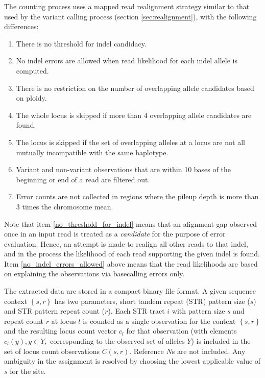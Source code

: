 \documentclass{article}
\begin{document}
The counting process uses a mapped read realignment strategy similar to that used by the variant calling process (section \ref{sec:realignment}), with the following differences:
 \begin{enumerate}
    \item \label{no_threshold_for_indel} There is no threshold for indel candidacy.
    \item \label{no_indel_errors_allowed} No indel errors are allowed when read likelihood for each indel allele is computed.
    \item There is no restriction on the number of overlapping allele candidates based on ploidy.
    \item The whole locus is skipped if more than 4 overlapping allele candidates are found.
    \item The locus is skipped if the set of overlapping alleles at a locus are not all mutually incompatible with the same haplotype. 
    \item Variant and non-variant observations that are within 10 bases of the beginning or end of a read are filtered out.
    \item Error counts are not collected in regions where the pileup depth is more than 3 times the chromosome mean.
 \end{enumerate}

Note that item \ref{no_threshold_for_indel} means that an alignment gap observed once in an input read is treated as a \emph{candidate} for the purpose of error evaluation. Hence, an attempt is made to realign all other reads to that indel, and in the process the likelihood of each read supporting the given indel is found.  Item \ref{no_indel_errors_allowed} above means that the read likelihoods are based on explaining the observations via basecalling errors only.

The extracted data are stored in a compact binary file format. A given sequence context $\left\{ s,r \right\}$ has two parameters, short tandem repeat (STR) pattern size ($s$) and STR pattern repeat count ($r$). Each STR tract $i$ with pattern size $s$ and repeat count $r$ at locus $l$ is counted as a single observation for the context $\left\{ s,r \right\}$ and the resulting locus count vector $c_l$ for that observation (with elements $c_l(y), y \in Y,$ corresponding to the observed set of alleles $Y$) is included in the set of locus count observations $C(s,r)$. Reference $N$s are not included. Any ambiguity in the assignment is resolved by choosing the lowest applicable value of $s$ for the site. 
\end{document}
